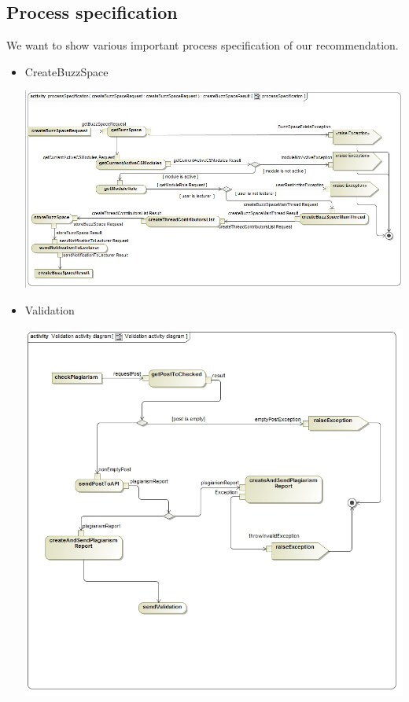 \documentclass[a4paper,12pt]{report}
\begin{document}
\subsection{Process specification}
We want to show various important process specification of our recommendation.
\begin{itemize}
	\item CreateBuzzSpace
		\begin{center}
  	 	\includegraphics[width=1\textwidth] {../Functional_Requirements_Diagrams/ActivityDiagrams/ActivityDIagram_CreateBuzzSpace.jpg}\\[0.4cm]    
		\end{center}
	\item Validation
		\begin{center}
  	 	\includegraphics[width=1\textwidth] {../Chris/Validationactivitydiagram.jpg}\\[0.4cm]    

\end{center}
\end{itemize}
\end{document}
